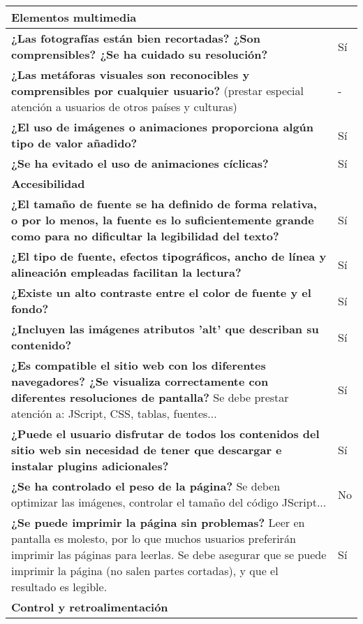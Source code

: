 \begin{longtable}[H]{p{31em}|p{5em}}
\multicolumn{2}{p{36em}}{\cellcolor[rgb]{ .851,  .886,  .953} \textbf{Elementos multimedia}} \\ \hline
\textbf{¿Las fotografías están bien recortadas? ¿Son comprensibles? ¿Se ha cuidado su resolución? } & Sí \\ \hline
\textbf{¿Las metáforas visuales son reconocibles y comprensibles por cualquier usuario?} (prestar especial atención a usuarios de otros países y culturas)  & - \\ \hline
\textbf{¿El uso de imágenes o animaciones proporciona algún tipo de valor añadido? } & Sí \\ \hline
\textbf{¿Se ha evitado el uso de animaciones cíclicas?} & Sí \\ \hline
\multicolumn{2}{p{36em}}{\cellcolor[rgb]{ .851,  .886,  .953} \textbf{Accesibilidad}} \\ \hline
\textbf{¿El tamaño de fuente se ha definido de forma relativa, o por lo menos, la fuente es lo suficientemente grande como para no dificultar la legibilidad del texto? } & Sí \\ \hline
\textbf{¿El tipo de fuente, efectos tipográficos, ancho de línea y alineación empleadas facilitan la lectura?} & Sí \\ \hline
\textbf{¿Existe un alto contraste entre el color de fuente y el fondo?} & Sí \\ \hline
\textbf{¿Incluyen las imágenes atributos 'alt' que describan su contenido? } & Sí \\ \hline
\textbf{¿Es compatible el sitio web con los diferentes navegadores? ¿Se visualiza correctamente con diferentes resoluciones de pantalla?} Se debe prestar atención a: JScript, CSS, tablas, fuentes...  & Sí \\ \hline
\textbf{¿Puede el usuario disfrutar de todos los contenidos del sitio web sin necesidad de tener que descargar e instalar plugins adicionales?} & Sí \\ \hline
\textbf{¿Se ha controlado el peso de la página?} Se deben optimizar las imágenes, controlar el tamaño del código JScript...  & No \\ \hline
\textbf{¿Se puede imprimir la página sin problemas?} Leer en pantalla es molesto, por lo que muchos usuarios preferirán imprimir las páginas para leerlas. Se debe asegurar que se puede imprimir la página (no salen partes cortadas), y que el resultado es legible.  & Sí \\ \hline
\multicolumn{2}{p{36em}}{\cellcolor[rgb]{ .851,  .886,  .953} \textbf{Control y retroalimentación}} \\ \hline

\end{longtable}
